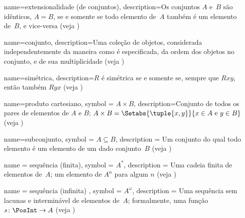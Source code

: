 
 {
  name={extensionalidade (de conjuntos)},  
  description={Os conjuntos $A$ e~$B$ são idênticos, $A = B$, se e somente se
    todo elemento de~$A$ também é um elemento de~$B$, e vice-versa
    (veja )}}


 {
  name=conjunto,  
  description={Uma coleção de objetos, considerada independentemente da
    maneira como é especificada, da ordem dos objetos no conjunto,
    e de sua multiplicidade (veja )} }

 {
  name=simétrica,  
  description={$R$ é simétrica se e somente se, sempre que $Rxy$, então também $Ryx$
    (veja )} }

 {
  name={produto cartesiano},
  symbol = {\ensuremath{A \times B}},  
  description={Conjunto de todos os pares de {elementos} de $A$ e $B$; $A
    \times B = \Setabs{\tuple{x, y}}{x \in A \text{ e } y \in B}$
    (veja )} }

 {
  name=subconjunto,
  symbol = {\ensuremath{A \subseteq B}},
  description = {Um conjunto do qual todo {elemento} é um {elemento} de
    um dado conjunto~$B$ (veja )}  }

 {
  name = {sequência (finita)},
  symbol = {\ensuremath{A^*}},
  description = {Uma cadeia finita de {elementos} de~$A$; um
    {elemento} de $A^n$ para algum $n$ (veja
    )}}

 {
  name = {sequência (infinita) },
  symbol = {\ensuremath{A^\omega}},
  description = {Uma sequência sem lacunas e interminável de {elementos} de~$A$;
    formalmente, uma função $s\colon \PosInt \to A$ (veja
    )}}

